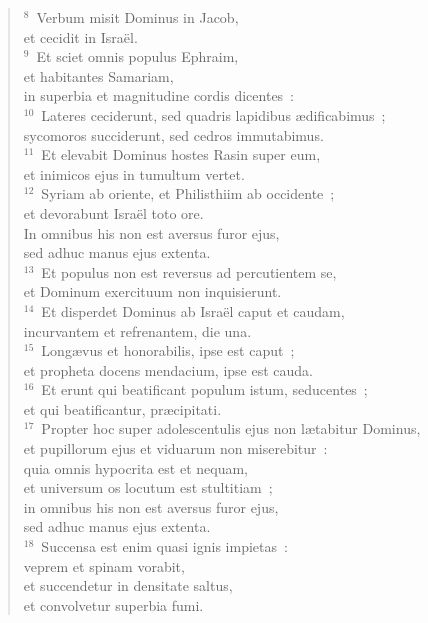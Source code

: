 \begin{flushleft}\begin{verse}${}^{8}$~Verbum misit Dominus in Jacob,\\ et cecidit in Isra\"el.\\
${}^{9}$~Et sciet omnis populus Ephraim,\\ et habitantes Samariam,\\ in superbia et magnitudine cordis dicentes~:\\
${}^{10}$~Lateres ceciderunt, sed quadris lapidibus \ae dificabimus~;\\ sycomoros succiderunt, sed cedros immutabimus.\\
${}^{11}$~Et elevabit Dominus hostes Rasin super eum,\\ et inimicos ejus in tumultum vertet.\\
${}^{12}$~Syriam ab oriente, et Philisthiim ab occidente~;\\ et devorabunt Isra\"el toto ore.\\ In omnibus his non est aversus furor ejus,\\ sed adhuc manus ejus extenta.\\
${}^{13}$~Et populus non est reversus ad percutientem se,\\ et Dominum exercituum non inquisierunt.\\
${}^{14}$~Et disperdet Dominus ab Isra\"el caput et caudam,\\ incurvantem et refrenantem, die una.\\
${}^{15}$~Long\ae vus et honorabilis, ipse est caput~;\\ et propheta docens mendacium, ipse est cauda.\\
${}^{16}$~Et erunt qui beatificant populum istum, seducentes~;\\ et qui beatificantur, pr\ae cipitati.\\
${}^{17}$~Propter hoc super adolescentulis ejus non l\ae tabitur Dominus,\\ et pupillorum ejus et viduarum non miserebitur~:\\ quia omnis hypocrita est et nequam,\\ et universum os locutum est stultitiam~;\\ in omnibus his non est aversus furor ejus,\\ sed adhuc manus ejus extenta.\\
${}^{18}$~Succensa est enim quasi ignis impietas~:\\ veprem et spinam vorabit,\\ et succendetur in densitate saltus,\\ et convolvetur superbia fumi.\\

\end{verse}
\end{flushleft}
